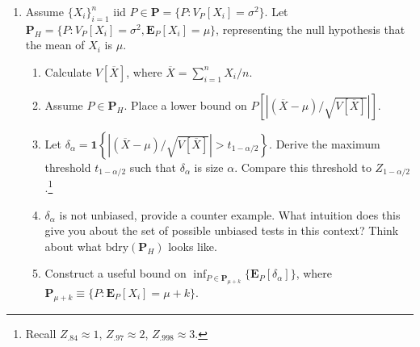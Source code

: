 \documentclass[12pt,english]{article}
\begin{document}
\begin{enumerate}
	\item Assume $\{ X_{i} \}_{i=1}^{n}$ iid $P \in \mathbf{P} = \{ P : V_{P}[X_{i}] = \sigma^{2} \}$. Let $\mathbf{P}_{H} = \{ P : V_{P}[X_{i}] =  \sigma^{2}, \mathbf{E}_{P}[X_{i}] = \mu \}$, representing the null hypothesis that the mean of $X_{i}$ is $\mu$.
	\begin{enumerate}
		\item Calculate $V[\overline{X}]$, where $\overline{X} = \sum_{i=1}^{n} X_{i} / n$.
		\item Assume $P \in \mathbf{P}_{H}$. Place a lower bound on $P\left[\left|(\overline{X} - \mu)/\sqrt{V[\overline{X}]} \right| \right]$.
		\item Let $\delta_{\alpha} = \mathbf{1}\left\{ \left|(\overline{X} - \mu)/\sqrt{V[\overline{X}]} \right| > t_{1 - \alpha/2} \right\}$. Derive the maximum threshold $t_{1 - \alpha/2}$ such that $\delta_{\alpha}$ is size $\alpha$. Compare this threshold to $Z_{1 - \alpha/2}$.\footnote{Recall $Z_{.84} \approx 1$, $Z_{.97} \approx 2$, $Z_{.998} \approx 3$.}
		\item $\delta_{\alpha}$ is not unbiased, provide a counter example. What intuition does this give you about the set of possible unbiased tests in this context? Think about what $\text{bdry}(\mathbf{P}_{H})$ looks like.
		\item Construct a useful bound on $\inf_{P \in \mathbf{P}_{\mu + k}} \{ \mathbf{E}_{P}[\delta_{\alpha}] \}$, where $\mathbf{P}_{\mu + k} \equiv \{ P : \mathbf{E}_{P}[X_{i}] = \mu + k \}$.
	\end{enumerate}
\end{enumerate}
\end{document}
